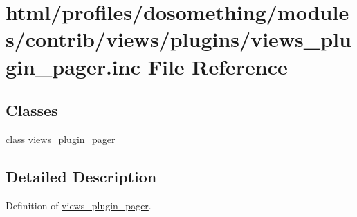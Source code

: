 \hypertarget{views__plugin__pager_8inc}{
\section{html/profiles/dosomething/modules/contrib/views/plugins/views\_\-plugin\_\-pager.inc File Reference}
\label{views__plugin__pager_8inc}
}
\subsection*{Classes}
\begin{DoxyCompactItemize}
\item 
class \hyperlink{classviews__plugin__pager}{views\_\-plugin\_\-pager}
\end{DoxyCompactItemize}


\subsection{Detailed Description}
Definition of \hyperlink{classviews__plugin__pager}{views\_\-plugin\_\-pager}. 